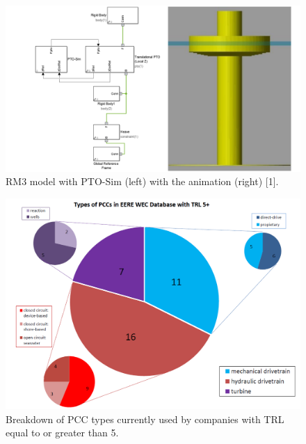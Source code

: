 \documentclass[twocolumn,10pt]{asme2e}
\begin{document}
\begin{figure}[t]
    \centering
    \includegraphics[width=1\columnwidth]{Images/RM3_update}
    \caption{RM3 model with PTO-Sim (left) with the animation (right) [1].}
    \label{RM3}
    \end{figure}

\begin{figure}[t]
    \centering
    \includegraphics[width=1\columnwidth]{Images/TRL}
    \caption{Breakdown of PCC types currently used by companies with TRL equal to or greater than 5.}
    \label{PCC_Breakdown}
    \end{figure}

\end{document}
